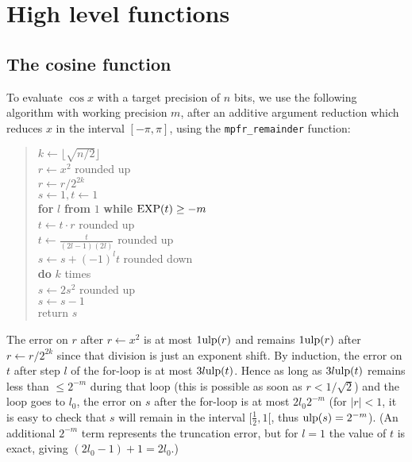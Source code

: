 \documentclass[12pt]{amsart}
\def\q{\hspace*{5mm}}
\def\ulp{{\rm ulp}}
\begin{document}
\section{High level functions}

\subsection{The cosine function}

To evaluate $\cos x$ with a target precision of $n$ bits, we use the following
algorithm with working precision $m$, after an additive argument reduction
which reduces $x$ in the interval $[-\pi, \pi]$, using the
\texttt{mpfr\_remainder} function:
\begin{quote}
$k \leftarrow \lfloor \sqrt{n/2} \rfloor$ \\
$r \leftarrow x^2$ rounded up \\ %
$r \leftarrow r/2^{2k}$ \\ %
$s \leftarrow 1, t \leftarrow 1$ \\ %
{\bf for} $l$ {\bf from} $1$ {\bf while} ${\rm EXP}(t) \ge -m$ \\
\q $t \leftarrow t \cdot r$ rounded up \\ %
\q $t \leftarrow \frac{t}{(2l-1)(2l)}$ rounded up \\ %
\q $s \leftarrow s + (-1)^l t$ rounded down\\ %
{\bf do} $k$ times \\
\q $s \leftarrow 2 s^2$ rounded up \\
\q $s \leftarrow s - 1$ \\
return $s$ \\
\end{quote}
The error on $r$ after $r \leftarrow x^2$
is at most $1 \ulp(r)$ and remains $1 \ulp(r)$ after
$r \leftarrow r/2^{2k}$ since that division is just an exponent shift.
By induction, the error on $t$ after step $l$ of the for-loop is at most
$3 l \ulp(t)$.
Hence as long as $3 l \ulp(t)$ remains less than $\le 2^{-m}$
during that loop
(this is possible as soon as $r < 1/\sqrt{2}$)
and the loop goes to $l_0$, the error on $s$ after the for-loop is at most
$2 l_0 2^{-m}$ (for $|r| < 1$, it is easy to check that $s$ will remain
in the interval $[\frac{1}{2}, 1[$, thus $\ulp(s) = 2^{-m}$).
(An additional $2^{-m}$ term represents the truncation error,
but for $l=1$ the value of $t$ is exact, giving $(2 l_0 - 1) + 1 = 2 l_0$.)
\end{document}
